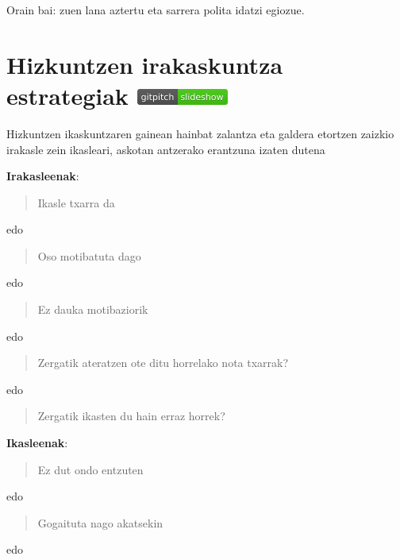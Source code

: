 \documentclass[
]{book}
\begin{document}
Orain bai: zuen lana aztertu eta sarrera polita idatzi egiozue.

\hypertarget{hizkuntzen-irakaskuntza-estrategiak-gitpitch}{%
\chapter[Hizkuntzen irakaskuntza estrategiak ]{\texorpdfstring{Hizkuntzen irakaskuntza estrategiak \href{https://gitpitch.com/JuanAbasolo/HD/04-gaia?grs=github\&t=simple}{\protect\includegraphics{assets/badge.png}}}{Hizkuntzen irakaskuntza estrategiak GitPitch}}\label{hizkuntzen-irakaskuntza-estrategiak-gitpitch}}

Hizkuntzen ikaskuntzaren gainean hainbat zalantza eta galdera etortzen zaizkio irakasle zein ikasleari, askotan antzerako erantzuna izaten dutena

\textbf{Irakasleenak}:

\begin{quote}
Ikasle txarra da
\end{quote}

edo

\begin{quote}
Oso motibatuta dago
\end{quote}

edo

\begin{quote}
Ez dauka motibaziorik
\end{quote}

edo

\begin{quote}
Zergatik ateratzen ote ditu horrelako nota txarrak?
\end{quote}

edo

\begin{quote}
Zergatik ikasten du hain erraz horrek?
\end{quote}

\textbf{Ikasleenak}:

\begin{quote}
Ez dut ondo entzuten
\end{quote}

edo

\begin{quote}
Gogaituta nago akatsekin
\end{quote}

edo
\end{document}
